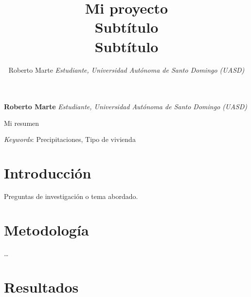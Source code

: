 \documentclass[11pt,]{article}
\title{Mi proyecto\\
Subtítulo\\
Subtítulo  }
\author{\Large Roberto Marte\vspace{0.05in} \newline\normalsize\emph{Estudiante, Universidad Autónoma de Santo Domingo (UASD)}  }
\date{}
\newcommand*{\authorfont}{\fontfamily{phv}\selectfont}
\renewenvironment{abstract}
 {{%
    \setlength{\leftmargin}{0mm}
    \setlength{\rightmargin}{\leftmargin}%
  }%
  \relax}
 {\endlist}
\begin{document}
	
%

{%
\setlength{\parindent}{0pt}
\thispagestyle{plain}
{\fontsize{18}{20}\selectfont\raggedright 
\maketitle  %

}

{
   \vskip 13.5pt\relax \normalsize\fontsize{11}{12} 
\textbf{\authorfont Roberto Marte} \hskip 15pt \emph{\small Estudiante, Universidad Autónoma de Santo Domingo (UASD)}   

}

}








\begin{abstract}

    \hbox{\vrule height .2pt width 39.14pc}

    \vskip 8.5pt %

\noindent Mi resumen


\vskip 8.5pt \noindent \emph{Keywords}: Precipitaciones, Tipo de vivienda \par

    \hbox{\vrule height .2pt width 39.14pc}



\end{abstract}


\vskip 6.5pt


\noindent  \section{Introducción}\label{introducciuxf3n}

Preguntas de investigación o tema abordado.

\section{Metodología}\label{metodologuxeda}

\ldots

\section{Resultados}\label{resultados}
\end{document}
